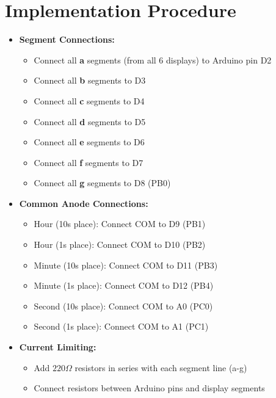 \documentclass[journal]{IEEEtran}
\begin{document}
\section{Implementation Procedure}
\begin{itemize}
    \item \textbf{Segment Connections:}
    \begin{itemize}
        \item Connect all \textbf{a} segments (from all 6 displays) to Arduino pin D2
        \item Connect all \textbf{b} segments to D3
        \item Connect all \textbf{c} segments to D4
        \item Connect all \textbf{d} segments to D5
        \item Connect all \textbf{e} segments to D6
        \item Connect all \textbf{f} segments to D7
        \item Connect all \textbf{g} segments to D8 (PB0)
    \end{itemize}
    
    \item \textbf{Common Anode Connections:}
    \begin{itemize}
        \item Hour (10s place): Connect COM to D9 (PB1)
        \item Hour (1s place): Connect COM to D10 (PB2)
        \item Minute (10s place): Connect COM to D11 (PB3)
        \item Minute (1s place): Connect COM to D12 (PB4)
        \item Second (10s place): Connect COM to A0 (PC0)
        \item Second (1s place): Connect COM to A1 (PC1)
    \end{itemize}
    
    \item \textbf{Current Limiting:}
    \begin{itemize}
        \item Add $220\Omega$ resistors in series with each segment line (a-g)
        \item Connect resistors between Arduino pins and display segments
    \end{itemize}
    
\end{itemize}
\end{document}
